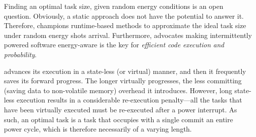 
Finding an optimal task size, given random energy conditions is an open question. Obviously, a static approach does not have the potential to answer it. Therefore, \sys champions runtime-based methods to approximate the ideal task size under random energy shots arrival. Furthermore, \sys advocates making intermittently powered software energy-aware is the key for \emph{efficient code execution and probability}. 

\sys advances its execution in a state-less (or virtual) manner, and then it frequently saves its forward progress. The longer \sys virtually progresses, the less committing (saving data to non-volatile memory) overhead it introduces. However, long state-less execution results in a considerable re-execution penalty---all the tasks that have been virtually executed must be re-executed after a power interrupt. As such, an optimal task is a task that occupies with a single commit an entire power cycle, which is therefore necessarily of a varying length.  

